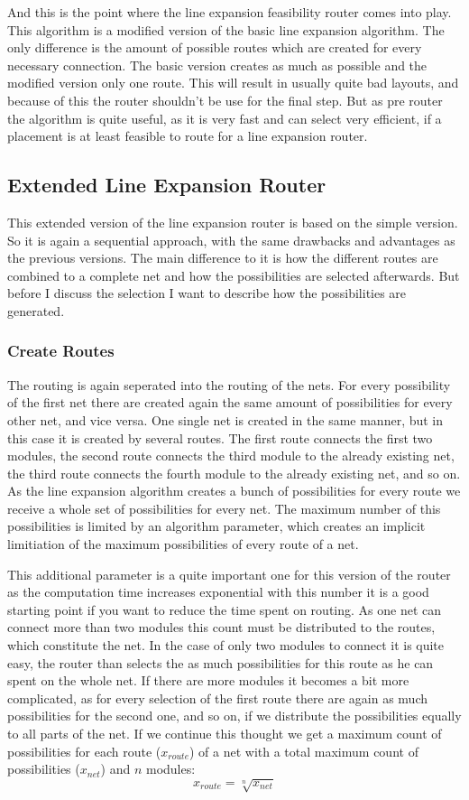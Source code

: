 And this is the point where the line expansion feasibility router comes into play. This algorithm is a modified version of the basic line expansion algorithm. The only difference  is the amount of possible routes which are created for every necessary connection. The basic version creates as much as possible and the modified version only one route. This will result in usually quite bad layouts, and because of this the router shouldn't be use for the final step. But as pre router the algorithm is quite useful, as it is very fast and can select very efficient, if a placement is at least feasible to route for a line expansion router.

\subsection{Extended Line Expansion Router}
This extended version of the line expansion router is based on the simple version. So it is again a sequential approach, with the same drawbacks and advantages as the previous versions. The main difference to it is how the different routes are combined to a complete net and how the possibilities are selected afterwards. But before I discuss the selection I want to describe how the possibilities are generated.

\subsubsection{Create Routes}
The routing is again seperated into the routing of the nets. For every possibility of the first net there are created again the same amount of possibilities for every other net, and vice versa. One single net is created in the same manner, but in this case it is created by several routes. The first route connects the first two modules, the second route connects the third module to the already existing net, the third route connects the fourth module to the already existing net, and so on. As the line expansion algorithm creates a bunch of possibilities for every route we receive a whole set of possibilities for every net. The maximum number of this possibilities is limited by an algorithm parameter, which creates an implicit limitiation of the maximum possibilities of every route of a net.

This additional parameter is a quite important one for this version of the router as the computation time increases exponential with this number it is a good starting point if you want to reduce the time spent on routing. As one net can connect more than two modules this count must be distributed to the routes, which constitute the net. In the case of only two modules to connect it is quite easy, the router than selects the as much possibilities for this route as he can spent on the whole net. If there are more modules it becomes a bit more complicated, as for every selection of the first route there are again as much possibilities for the second one, and so on, if we distribute the possibilities equally to all parts of the net. If we continue this thought we get a maximum count of possibilities for each route ($x_{route}$) of a net with a total maximum count of possibilities ($x_{net}$) and $n$ modules:
\[x_{route} = \sqrt[n]{x_{net}}\]

